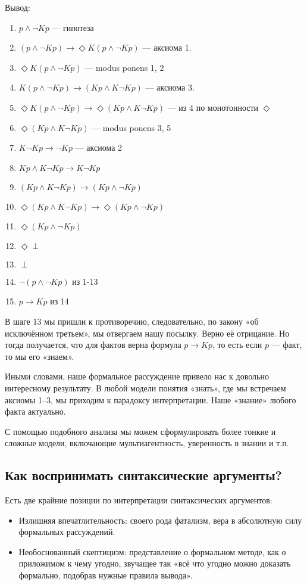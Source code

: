 \documentclass[openany]{book}
\theoremstyle{plain}
\theoremstyle{definition}
\begin{document}
Вывод:
\begin{enumerate}
    \item \(p \land \neg Kp\) — гипотеза
    \item \((p \land \neg Kp) \to \Diamond K (p \land \neg K p)\) — аксиома 1.
    \item \(\Diamond K(p \land \neg K p)\) — modus ponens 1, 2
    \item \(K(p \land \neg Kp) \to (Kp \land K \neg Kp)\) — аксиома 3.
    \item \(\Diamond K(p \land \neg K p) \to \Diamond (Kp \land K\neg Kp)\) — из 4 по монотонности \(\Diamond\)
    \item \(\Diamond(K p \land K \neg Kp)\) — modus ponens 3, 5
    \item \(K \neg Kp \to \neg Kp\) — аксиома 2
    \item \(Kp \land K \neg Kp \to K \neg Kp\)
    \item \((Kp \land K \neg Kp) \to (Kp \land \neg Kp)\)
    \item \(\Diamond (Kp \land K\neg Kp) \to \Diamond(Kp \land \neg Kp)\)
    \item \(\Diamond (Kp \land \neg Kp)\)
    \item \(\Diamond \perp\)
    \item \(\perp\)
    \item \(\neg (p \land \neg Kp)\) из 1-13
    \item \(p \to Kp\) из 14
\end{enumerate}

В шаге 13 мы пришли к противоречию, следовательно, по закону «об исключённом третьем», мы отвергаем нашу посылку. Верно её отрицание. Но тогда получается, что для фактов верна формула \(p \to Kp\), то есть если \(p\) --- факт, то мы его «знаем».

Иными словами, наше формальное рассуждение привело нас к довольно интересному результату. В любой модели понятия «знать», где мы встречаем аксиомы 1–3, мы приходим к парадоксу интерпретации. Наше «знание» любого факта актуально.

С помощью подобного анализа мы можем сформулировать более тонкие и сложные модели, включающие мультиагентность, уверенность в знании и т.п.

\subsection{ Как воспринимать синтаксические аргументы? }

Есть две крайние позиции по интерпретации синтаксических аргументов:\
\begin{itemize}
    \item Излишняя впечатлительность:
	своего рода фатализм, вера в абсолютную силу формальных рассуждений.
    \item Необоснованный скептицизм:
	представление о формальном методе, как о приложимом к чему угодно, звучащее так «всё что угодно можно доказать формально, подобрав нужные правила вывода».
\end{itemize}
\end{document}
